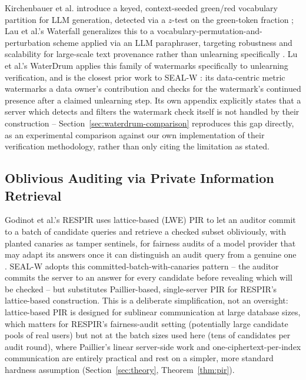 \documentclass[10pt,journal,compsoc]{IEEEtran}
\begin{document}
Kirchenbauer et al. introduce a keyed, context-seeded green/red vocabulary partition for LLM generation, detected via a $z$-test on the green-token fraction \cite{kirchenbauer2023watermark}; Lau et al.'s Waterfall generalizes this to a vocabulary-permutation-and-perturbation scheme applied via an LLM paraphraser, targeting robustness and scalability for large-scale text provenance rather than unlearning specifically \cite{lau2024waterfall}. Lu et al.'s WaterDrum applies this family of watermarks specifically to unlearning verification, and is the closest prior work to SEAL-W \cite{lu2026waterdrum}: its data-centric metric watermarks a data owner's contribution and checks for the watermark's continued presence after a claimed unlearning step. Its own appendix explicitly states that a server which detects and filters the watermark check itself is not handled by their construction -- Section~\ref{sec:waterdrum-comparison} reproduces this gap directly, as an experimental comparison against our own implementation of their verification methodology, rather than only citing the limitation as stated.

\subsection{Oblivious Auditing via Private Information Retrieval}

Godinot et al.'s RESPIR uses lattice-based (LWE) PIR to let an auditor commit to a batch of candidate queries and retrieve a checked subset obliviously, with planted canaries as tamper sentinels, for fairness audits of a model provider that may adapt its answers once it can distinguish an audit query from a genuine one \cite{godinot2026respir}. SEAL-W adopts this committed-batch-with-canaries pattern -- the auditor commits the server to an answer for every candidate before revealing which will be checked -- but substitutes Paillier-based, single-server PIR \cite{paillier1999} for RESPIR's lattice-based construction. This is a deliberate simplification, not an oversight: lattice-based PIR is designed for sublinear communication at large database sizes, which matters for RESPIR's fairness-audit setting (potentially large candidate pools of real users) but not at the batch sizes used here (tens of candidates per audit round), where Paillier's linear server-side work and one-ciphertext-per-index communication are entirely practical and rest on a simpler, more standard hardness assumption (Section~\ref{sec:theory}, Theorem~\ref{thm:pir}).
\end{document}
